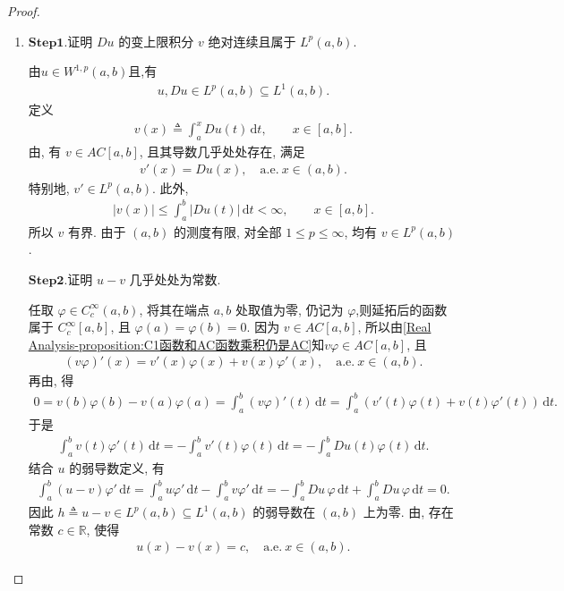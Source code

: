 \documentclass[../../main.tex]{subfiles}
\begin{document}
\begin{proof}
\begin{enumerate}[(1)]
\item \noindent$\mathbf{Step}\mathbf{1}.${\heiti 证明 $Du$ 的变上限积分 $v$ 绝对连续且属于 $L^p(a,b)$.}

由$u\in W^{1,p}(a,b)$且,有
\begin{align*}
u,Du\in L^p(a,b)\subseteq L^1(a,b).
\end{align*}
定义
\begin{align*}
v(x)\triangleq\int_a^xDu(t)\,\mathrm{d}t,\qquad x\in[a,b].
\end{align*}
由, 有 $v\in AC[a,b]$, 且其导数几乎处处存在, 满足
\begin{align*}
v'(x)=Du(x),\quad \mathrm{a.e.}\ x\in(a,b).
\end{align*}
特别地, $v'\in L^p(a,b)$. 此外,
\begin{align*}
|v(x)|
\leqslant\int_a^b|Du(t)|\,\mathrm{d}t<\infty,\qquad x\in[a,b].
\end{align*}
所以 $v$ 有界. 由于 $(a,b)$ 的测度有限, 对全部 $1\leqslant p\leqslant\infty$, 均有 $v\in L^p(a,b)$.

\noindent$\mathbf{Step}\mathbf{2}.${\heiti 证明 $u-v$ 几乎处处为常数.}

任取 $\varphi\in C_c^\infty(a,b)$, 将其在端点 $a,b$ 处取值为零, 仍记为 $\varphi$,则延拓后的函数属于 $C_c^\infty[a,b]$, 且 $\varphi(a)=\varphi(b)=0$. 因为 $v\in AC[a,b]$, 所以由\cref{Real Analysis-proposition:C1函数和AC函数乘积仍是AC}知$v\varphi\in AC[a,b]$, 且
\begin{align*}
(v\varphi)'(x)
=v'(x)\varphi(x)+v(x)\varphi'(x),\quad
\mathrm{a.e.}\ x\in(a,b).
\end{align*}
再由, 得
\begin{align*}
0=v(b)\varphi(b)-v(a)\varphi(a)
=\int_a^b(v\varphi)'(t)\,\mathrm{d}t=\int_a^b
\left(v'(t)\varphi(t)+v(t)\varphi'(t)\right)\,\mathrm{d}t.
\end{align*}
于是
\begin{align*}
\int_a^bv(t)\varphi'(t)\,\mathrm{d}t
=-\int_a^bv'(t)\varphi(t)\,\mathrm{d}t
=-\int_a^bDu(t)\varphi(t)\,\mathrm{d}t.
\end{align*}
结合 $u$ 的弱导数定义, 有
\begin{align*}
\int_a^b(u-v)\varphi'\,\mathrm{d}t
=\int_a^bu\varphi'\,\mathrm{d}t
-\int_a^bv\varphi'\,\mathrm{d}t
=-\int_a^bDu\,\varphi\,\mathrm{d}t
+\int_a^bDu\,\varphi\,\mathrm{d}t
=0.
\end{align*}
因此 $h\triangleq u-v\in L^p(a,b)\subseteq L^1(a,b)$ 的弱导数在 $(a,b)$ 上为零. 由, 存在常数 $c\in\mathbb{R}$, 使得
\begin{align*}
u(x)-v(x)=c,\quad \mathrm{a.e.}\ x\in(a,b).
\end{align*}


\end{enumerate}
\end{proof}
\end{document}
